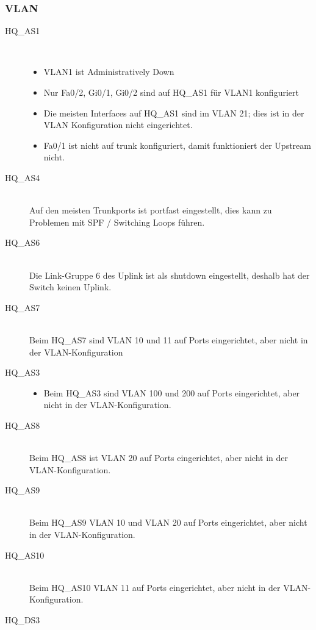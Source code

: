 \subsubsection{VLAN}
\begin{description}
	\item[HQ\_AS1] \hfill \\
	  \begin{itemize}
		  \item VLAN1 ist Administratively Down
		  \item Nur Fa0/2, Gi0/1, Gi0/2 sind auf HQ\_AS1 für VLAN1 konfiguriert
		  \item Die meisten Interfaces auf HQ\_AS1 sind im VLAN 21; dies ist in  der VLAN Konfiguration nicht eingerichtet.
		  \item Fa0/1 ist nicht auf trunk konfiguriert, damit funktioniert der Upstream nicht.
	  \end{itemize}
	\item[HQ\_AS4] \hfill \\
	 Auf den meisten Trunkports ist portfast eingestellt, dies kann zu Problemen mit SPF / Switching Loops führen.
	\item[HQ\_AS6] \hfill \\
	 Die Link-Gruppe 6 des Uplink ist als shutdown eingestellt, deshalb hat der Switch keinen Uplink.
	\item[HQ\_AS7] \hfill \\
	 Beim HQ\_AS7 sind VLAN 10 und 11 auf Ports eingerichtet, aber nicht in der VLAN-Konfiguration
	\item[HQ\_AS3] \hfill 
	\begin{itemize}
		\item Beim HQ\_AS3 sind VLAN 100 und 200 auf Ports eingerichtet, aber nicht in der VLAN-Konfiguration.
	\end{itemize}
	\item[HQ\_AS8] \hfill \\
	 Beim HQ\_AS8 ist VLAN 20 auf Ports eingerichtet, aber nicht in der VLAN-Konfiguration.
	\item[HQ\_AS9] \hfill \\
	 Beim HQ\_AS9 VLAN 10 und VLAN 20 auf Ports eingerichtet, aber nicht in der VLAN-Konfiguration.
	\item[HQ\_AS10] \hfill \\
	 Beim HQ\_AS10 VLAN 11 auf Ports eingerichtet, aber nicht in der VLAN-Konfiguration.
	\item[HQ\_DS3] \hfill \\

\end{description}
